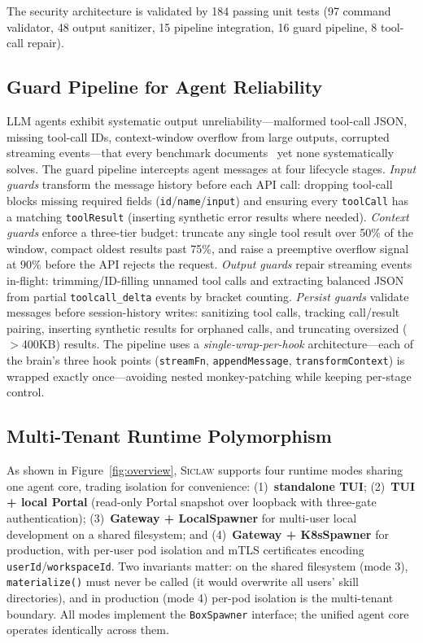 \documentclass[letterpaper]{article}
\newcommand{\sys}{\textsc{Siclaw}}
\begin{document}
The security architecture is validated by 184 passing unit tests (97 command validator, 48 output sanitizer, 15 pipeline integration, 16 guard pipeline, 8 tool-call repair).


\subsection{Guard Pipeline for Agent Reliability}
\label{sec:guards}

LLM agents exhibit systematic output unreliability---malformed tool-call JSON, missing tool-call IDs, context-window overflow from large outputs, corrupted streaming events---that every benchmark documents~\cite{chen2025aiopslab,clark2026sregym} yet none systematically solves. The guard pipeline intercepts agent messages at four lifecycle stages.
\emph{Input guards} transform the message history before each API call: dropping tool-call blocks missing required fields (\texttt{id}/\texttt{name}/\texttt{input}) and ensuring every \texttt{toolCall} has a matching \texttt{toolResult} (inserting synthetic error results where needed).
\emph{Context guards} enforce a three-tier budget: truncate any single tool result over 50\% of the window, compact oldest results past 75\%, and raise a preemptive overflow signal at 90\% before the API rejects the request.
\emph{Output guards} repair streaming events in-flight: trimming/ID-filling unnamed tool calls and extracting balanced JSON from partial \texttt{toolcall\_delta} events by bracket counting.
\emph{Persist guards} validate messages before session-history writes: sanitizing tool calls, tracking call/result pairing, inserting synthetic results for orphaned calls, and truncating oversized ($>$400KB) results.
The pipeline uses a \emph{single-wrap-per-hook} architecture---each of the brain's three hook points (\texttt{streamFn}, \texttt{appendMessage}, \texttt{transformContext}) is wrapped exactly once---avoiding nested monkey-patching while keeping per-stage control.


\subsection{Multi-Tenant Runtime Polymorphism}
\label{sec:multitenant}

As shown in Figure~\ref{fig:overview}, \sys{} supports four runtime modes sharing one agent core, trading isolation for convenience: (1)~\textbf{standalone TUI}; (2)~\textbf{TUI + local Portal} (read-only Portal snapshot over loopback with three-gate authentication); (3)~\textbf{Gateway + LocalSpawner} for multi-user local development on a shared filesystem; and (4)~\textbf{Gateway + K8sSpawner} for production, with per-user pod isolation and mTLS certificates encoding \texttt{userId}/\texttt{workspaceId}.
Two invariants matter: on the shared filesystem (mode 3), \texttt{materialize()} must never be called (it would overwrite all users' skill directories), and in production (mode 4) per-pod isolation is the multi-tenant boundary. All modes implement the \texttt{BoxSpawner} interface; the unified agent core operates identically across them.
\end{document}
